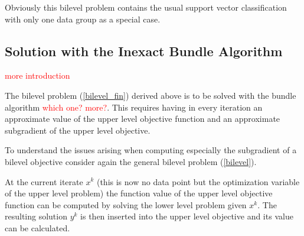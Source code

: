 Obviously this bilevel problem contains the usual support vector classification with only one data group as a special case.


%
%

%





\subsection{Solution with the Inexact Bundle Algorithm}

\textcolor{red}{more introduction}

The bilevel problem (\ref{bilevel_fin}) derived above is to be solved with the bundle algorithm \textcolor{red}{which one? more?}.
This requires having in every iteration an approximate value of the upper level objective function and an approximate subgradient of the upper level objective.

To understand the issues arising when computing especially the subgradient of a bilevel objective consider again the general bilevel problem (\ref{bilevel}).

At the current iterate \(x^k\) (this is now no data point but the optimization variable of the upper level problem) the function value of the upper level objective function can be computed by solving the lower level problem given \(x^k\).
The resulting solution \(y^k\) is then inserted into the upper level objective and its value can be calculated.

